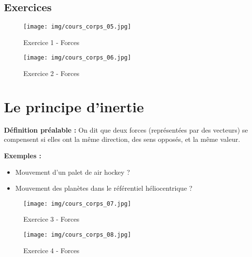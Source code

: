 \documentclass[a4paper,12pt]{article}
\begin{document}
\subsection*{Exercices}

\begin{figure}[H]
  \centering
  \texttt{[image: img/cours\_corps\_05.jpg]}
  \caption{\label{} Exercice 1 - Forces}
\end{figure}


\begin{figure}[H]
  \centering
  \texttt{[image: img/cours\_corps\_06.jpg]}
  \caption{\label{} Exercice 2 - Forces}
\end{figure}

\section*{Le principe d'inertie}

\begin{tcolorbox}[colback=green!10!white, colframe=green!75!black, title=Principe d'inertie]
  \textbf{Définition préalable :} On dit que deux forces (représentées par des vecteurs) se compensent si elles ont la même direction, des sens opposés, et la même valeur. \par
  \vspace{15em}
\end{tcolorbox}

\textbf{Exemples : }
\begin{itemize}
\item Mouvement d'un palet de air hockey ?
\vspace{3em}
\item Mouvement des planètes dans le référentiel héliocentrique ?
\vspace{3em}
\end{itemize}

\begin{figure}[H]
  \centering
  \texttt{[image: img/cours\_corps\_07.jpg]}
  \caption{\label{} Exercice 3 - Forces}
\end{figure}


\begin{figure}[H]
  \centering
  \texttt{[image: img/cours\_corps\_08.jpg]}
  \caption{\label{} Exercice 4 - Forces}
\end{figure}
\end{document}
